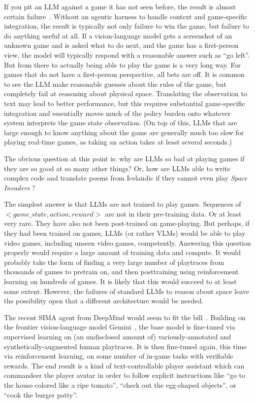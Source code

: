 \documentclass[runningheads]{llncs}
\begin{document}
If you pit an LLM against a game it has not seen before, the result is almost certain failure~\cite{li2025gvgai}. Without an agentic harness to handle context and game-specific integration, the result is typically not only failure to win the game, but failure to do anything useful at all. If a vision-language model gets a screenshot of an unknown game and is asked what to do next, and the game has a first-person view, the model will typically respond with a reasonable answer such as ``go left''. But from there to actually being able to play the game is a very long way. For games that do not have a first-person perspective, all bets are off. It is common to see the LLM make reasonable guesses about the rules of the game, but completely fail at reasoning about physical space. Translating the observation to text may lead to better performance, but this requires substantial game-specific integration and essentially moves much of the policy burden onto whatever system interprets the game state observation. (On top of this, LLMs that are large enough to know anything about the game are generally much too slow for playing real-time games, as taking an action takes at least several seconds.)

The obvious question at this point is: why are LLMs so bad at playing games if they are so good at so many other things? Or, how are LLMs able to write complex code and translate poems from Icelandic if they cannot even play \textit{Space Invaders} \cite{space_invaders}?

The simplest answer is that LLMs are not trained to play games. Sequences of $<game\_state, action, reward>$ are not in their pre-training data. Or at least very rare. They have also not been post-trained on game-playing. But perhaps, if they had been trained on games, LLMs (or rather VLMs) would be able to play video games, including unseen video games, competently. Answering this question properly would require a large amount of training data and compute. It would probably take the form of finding a very large number of playtraces from thousands of games to pretrain on, and then posttraining using reinforcement learning on hundreds of games. It is likely that this would succeed to at least some extent. However, the failures of standard LLMs to reason about space leave the possibility open that a different architecture would be needed.

The recent SIMA agent from DeepMind would seem to fit the bill~\cite{raad2024scaling}. Building on the frontier vision-language model Gemini~\cite{comanici2025gemini}, the base model is fine-tuned via supervised learning on (an undisclosed amount of) variously-annotated and synthetically-augmented human playtraces. It is then fine-tuned again, this time via reinforcement learning, on some number of in-game tasks with verifiable rewards. The end result is a kind of text-controllable player assistant which can commandeer the player avatar in order to follow explicit instructions like ``go to the house colored like a ripe tomato'', ``check out the egg-shaped objects'', or ``cook the burger patty''.
\end{document}
